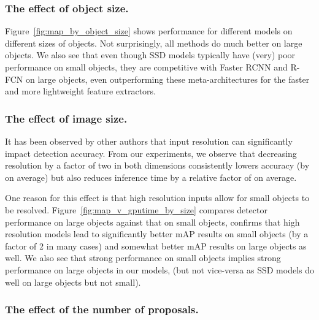 \documentclass[10pt,twocolumn,letterpaper]{article}
\renewcommand{\paragraph}[1]{\subsubsection{#1}}
\begin{document}
\paragraph{The effect of object size.}
\vspace{-2mm}
Figure~\ref{fig:map_by_object_size} shows performance for different
models on different sizes of objects.
Not surprisingly, all methods do much better on large objects.
We also see that even though SSD models
typically have (very) poor performance on small objects, they are
competitive with Faster RCNN and R-FCN on large objects, even
outperforming these meta-architectures 
for the faster and more lightweight feature extractors.


\paragraph{The effect of image size.}


It has been observed by other authors that  input resolution can
significantly impact detection accuracy.  From our experiments, we
observe that decreasing resolution by a factor of two in both
dimensions consistently lowers accuracy (by  on average) but
also reduces inference time by a relative factor of  on
average. 

One reason for this effect is that high resolution inputs allow for
small objects to be resolved. Figure~\ref{fig:map_v_gputime_by_size}
compares detector performance on large objects against that on
small objects, confirms that high resolution models lead to
significantly better mAP results on small objects (by a factor of 2 in
many cases) and somewhat better mAP results on large objects as well.  
We also see that strong performance on small objects implies strong
performance on large objects in our models, (but not vice-versa as SSD
models do well on large objects but not small). 





\paragraph{The effect of the number of proposals.}
\end{document}
